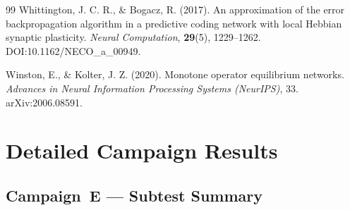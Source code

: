 \documentclass[11pt,a4paper]{article}
\begin{document}
\begin{thebibliography}{99}
Whittington, J. C. R., \& Bogacz, R. (2017).
An approximation of the error backpropagation algorithm in a predictive coding network
with local Hebbian synaptic plasticity.
\textit{Neural Computation}, \textbf{29}(5), 1229--1262.
DOI:10.1162/NECO\_a\_00949.

Winston, E., \& Kolter, J. Z. (2020).
Monotone operator equilibrium networks.
\textit{Advances in Neural Information Processing Systems (NeurIPS)}, 33.
arXiv:2006.08591.

\end{thebibliography}

\appendix

\section{Detailed Campaign Results}

\subsection{Campaign~E --- Subtest Summary}
\end{document}
